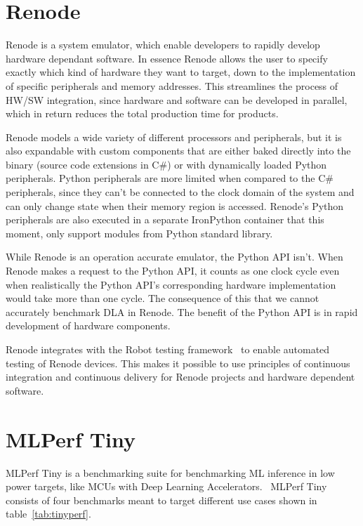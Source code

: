 \documentclass[12pt,a4paper,english
]{tunithesis}
\begin{document}
\section{Renode}
\label{sec:renode}
Renode is a system emulator, which enable developers to rapidly develop hardware dependant software. In essence Renode allows the user to specify exactly which kind of hardware they want to target, down to the implementation of specific peripherals and memory addresses. This streamlines the process of HW/SW integration, since hardware and software can be developed in parallel, which in return reduces the total production time for products.

Renode models a wide variety of different processors and peripherals, but it is also expandable with custom components that are either baked directly into the binary (source code extensions in C\#) or with dynamically loaded Python peripherals. Python peripherals are more limited when compared to the C\# peripherals, since they can't be connected to the clock domain of the system and can only change state when their memory region is accessed. Renode's Python peripherals are also executed in a separate IronPython container that this moment, only support modules from Python standard library.

While Renode is an operation accurate emulator, the Python API isn't. When Renode makes a request to the Python API, it counts as one clock cycle even when realistically the Python API's corresponding hardware implementation would take more than one cycle. The consequence of this that we cannot accurately benchmark DLA in Renode. The benefit of the Python API is in rapid development of hardware components.

Renode integrates with the Robot testing framework~\cite{robotframework} to enable automated testing of Renode devices. This makes it possible to use principles of continuous integration and continuous delivery for Renode projects and hardware dependent software.

\section{MLPerf Tiny}
\label{sec:tinyperf}
MLPerf Tiny is a benchmarking suite for benchmarking ML inference in low power targets, like MCUs with Deep Learning Accelerators.~\parencite{tinyperf}
MLPerf Tiny consists of four benchmarks meant to target different use cases shown in table~\ref{tab:tinyperf}.
\end{document}
